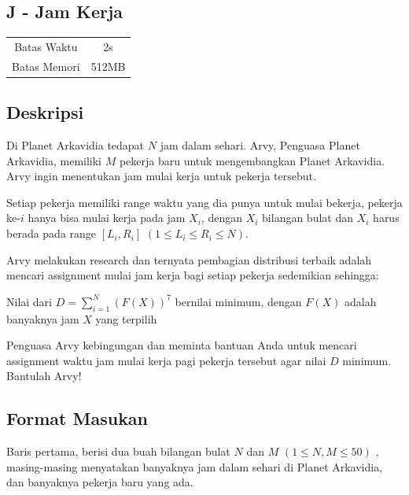 \documentclass{article}
\begin{document}
\begin{center}
    \section*{J - Jam Kerja} %

    \begin{tabular}{ | c c | }
        \hline
        Batas Waktu  & 2s \\    %
        Batas Memori & 512MB \\  %
        \hline
    \end{tabular}
\end{center}

\subsection*{Deskripsi}
Di Planet Arkavidia tedapat $N$ jam dalam sehari. Arvy, Penguasa Planet Arkavidia, memiliki $M$ pekerja baru untuk mengembangkan Planet Arkavidia. Arvy ingin menentukan jam mulai kerja untuk pekerja tersebut.

Setiap pekerja memiliki range waktu yang dia punya untuk mulai bekerja, pekerja ke-$i$ hanya bisa mulai kerja pada jam $X_i$, dengan $X_i$ bilangan bulat dan $X_i$ harus berada pada range $\left[L_i, R_i\right]$ $(1 \leq L_i \leq R_i \leq N)$.

Arvy melakukan research dan ternyata pembagian distribusi terbaik adalah mencari assignment mulai jam kerja bagi setiap pekerja sedemikian sehingga:

\begin{center}
Nilai dari $D = \sum_{i = 1}^{N} (F(X))^7$ bernilai minimum, dengan $F(X)$ adalah banyaknya jam $X$ yang terpilih
\end{center}

Penguasa Arvy kebingungan dan meminta bantuan Anda untuk mencari assignment waktu jam mulai kerja pagi pekerja tersebut agar nilai $D$ minimum. Bantulah Arvy!

\subsection*{Format Masukan}

Baris pertama, berisi dua buah bilangan bulat $N$ dan $M$ $(1 \leq N, M \leq 50)$ , masing-masing menyatakan banyaknya jam dalam sehari di Planet Arkavidia, dan banyaknya pekerja baru yang ada.
\end{document}
